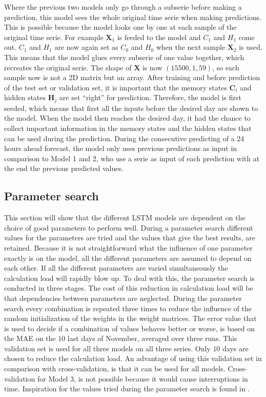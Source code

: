 Where the previous two models only go through a subserie before making a prediction, this model sees the whole original time serie when making predictions. This is possible because the model looks one by one at each sample of the original time serie. For example $ \bm{X}_{1} $ is feeded to the model and $ C_{1} $ and $ H_{1} $ come out.  $ C_{1} $ and $ H_{1} $ are now again set as $ C_{0} $ and $ H_{0} $ when the next sample $ \bm{X}_{2}  $ is used. This means that the model glues every subserie of one value together, which recreates the original serie. The shape of $ \bm{X} $ is now $ (15500, 1, 59) $, so each sample now is not a 2D matrix but an array. After training and before prediction of the test set or validation set, it is important that the memory states $ \bm{C}_{i} $  and hidden states $ \bm{H}_{j} $ are set ``right'' for prediction. Therefore, the model is first seeded, which means that first all the inputs before the desired day are shown to the model. When the model then reaches the desired day, it had the chance to collect important information in the memory states and the hidden states that can be used during the prediction. During the consecutive predicting of a 24 hours ahead forecast, the model only uses previous predictions as input in comparison to Model 1 and 2, who use a serie as input of each prediction with at the end the previous predicted values.

\subsection{Parameter search}\label{s:Parameter search}
This section will show that the different LSTM models are dependent on the choice of good parameters to perform well. During a parameter search different values for the parameters are tried and the values that give the best results, are retained. Because it is not straightforward what the influence of one parameter exactly is on the model, all the different parameters are assumed to depend on each other. If all the different parameters are varied simultaneously the calculation load will rapidly blow up. To deal with this, the parameter search is conducted in three stages. The cost of this reduction in calculation load will be that dependencies between parameters are neglected. During the parameter search every combination is repeated three times to reduce the influence of the random initialization of the weights in the weight matrices. The error value that is used to decide if a combination of values behaves better or worse, is based on the MAE on the $ 10 $ last days of November, averaged over three runs. This validation set is used for all three models on all three series. Only $ 10 $ days are chosen to reduce the calculation load. An advantage of using this validation set in comparison with cross-validation, is that it can be used for all models. Cross-validation for Model 3, is not possible because it would cause interruptions in time. Inspiration for the values tried during the parameter search is found in \cite{Shi2018}.

